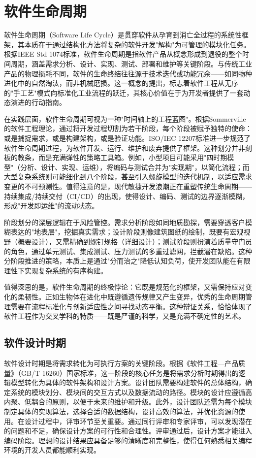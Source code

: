 \section{软件生命周期}

软件生命周期（Software Life Cycle）是贯穿软件从孕育到消亡全过程的系统性框架，其本质在于通过结构化方法将复杂的软件开发"解构"为可管理的模块化任务。根据IEEE Std 1074标准，软件生命周期是指软件产品从概念形成到退役的整个时间周期，涵盖需求分析、设计、实现、测试、部署和维护等关键阶段。与传统工业产品的物理损耗不同，软件的生命终结往往源于技术迭代或功能冗余——如同物种进化中的自然淘汰，而非机械磨损。这一概念的提出，标志着软件工程从无序的"手工艺"模式向标准化工业流程的跃迁，其核心价值在于为开发者提供了一套动态演进的行动指南。

在实践层面，软件生命周期可视为一种"时间轴上的工程蓝图"。根据Sommerville的软件工程理论，通过将开发过程切割为若干阶段，每个阶段被赋予独特的使命：或是捕捉需求，或是构建架构，或是验证功能。ISO/IEC 12207标准进一步规范了软件生命周期过程，为软件开发、运行、维护和废弃提供了框架。这种划分并非刻板的教条，而是充满弹性的策略工具箱。例如，小型项目可能采用"四时期模型"（分析、设计、实现、运维），将编码与测试合并为"实现期"，以简化流程；而大型复杂系统则可能细化到八个阶段，甚至引入螺旋模型的迭代机制，以适应需求变更的不可预测性。值得注意的是，现代敏捷开发浪潮正在重塑传统生命周期——持续集成/持续交付（CI/CD）的出现，使得设计、编码、测试的边界逐渐模糊，形成"开发即运维"的流动状态。

阶段划分的深层逻辑在于风险管控。需求分析阶段如同地质勘探，需要穿透客户模糊表达的"地表层"，挖掘真实需求；设计阶段则像建筑图纸的绘制，既要有宏观视野（概要设计），又需精确到螺钉规格（详细设计）；测试阶段则扮演着质量守门员的角色，通过单元测试、集成测试、压力测试的多重过滤网，拦截潜在缺陷。这种分阶段推进的策略，本质上是通过"分而治之"降低认知负荷，使开发团队能在有限理性下实现复杂系统的有序构建。

值得深思的是，软件生命周期的终极悖论：它既是规范化的框架，又需保持应对变化的柔韧性。正如生物体在进化中既遵循遗传规律又产生变异，优秀的生命周期管理需要在流程标准化与创新适应性之间寻找动态平衡。这种辩证关系，恰恰体现了软件工程作为交叉学科的特质——既是严谨的科学，又是充满不确定性的艺术。

\subsection{软件设计时期}

软件设计时期是将需求转化为可执行方案的关键阶段。根据《软件工程—产品质量》（GB/T 16260）国家标准，这一阶段的核心任务是将需求分析时期得出的逻辑模型转化为具体的软件架构和设计方案。设计团队需要构建软件的总体结构，确定系统的模块划分、模块间的交互方式以及数据流动的路径。模块的设计应遵循高内聚、低耦合的原则，以便于未来的维护和升级。此外，设计团队还需为每个模块制定具体的实现算法，选择合适的数据结构，设计高效的算法，并优化资源的使用。在设计过程中，评审环节至关重要。通过同行评审和专家评审，可以发现潜在的问题和不足，确保设计方案的可行性和合理性。评审通过后，设计方案才能进入编码阶段。理想的设计结果应具备足够的清晰度和完整性，使得任何熟悉相关编程环境的开发人员都能顺利实现。

